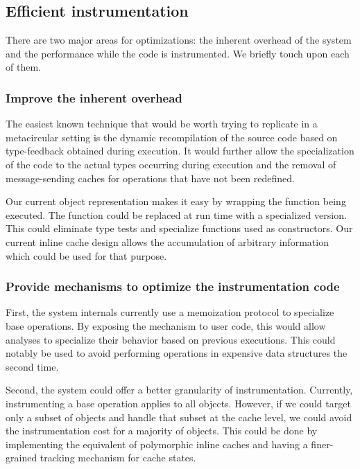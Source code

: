\subsection{Efficient instrumentation}

There are two major areas for optimizations: the inherent overhead of the
system and the performance while the code is instrumented. We briefly touch
upon each of them. 

\subsubsection{Improve the inherent overhead}

The easiest known technique that would be worth trying to replicate in a
metacircular setting is the dynamic recompilation of the source code based on
type-feedback obtained during execution. It would further allow the
specialization of the code to the actual types occurring during execution and
the removal of message-sending caches for operations that have not been
redefined.

Our current object representation makes it easy by wrapping the function being
executed.  The function could be replaced at run time with a specialized
version. This could eliminate type tests and specialize functions used as
constructors. Our current inline cache design allows the accumulation of
arbitrary information which could be used for that purpose.

\subsubsection{Provide mechanisms to optimize the instrumentation code}

First, the system internals currently use a memoization protocol to specialize base
operations. By exposing the mechanism to user code, this would allow analyses to
specialize their behavior based on previous executions. This could notably be
used to avoid performing operations in expensive data structures the second
time.

Second, the system could offer a better granularity of instrumentation.
Currently, instrumenting a base operation applies to all objects. However, if
we could target only a subset of objects and handle that subset at the cache
level, we could avoid the instrumentation cost for a majority of objects. This
could be done by implementing the equivalent of polymorphic inline caches and
having a finer-grained tracking mechanism for cache states.


